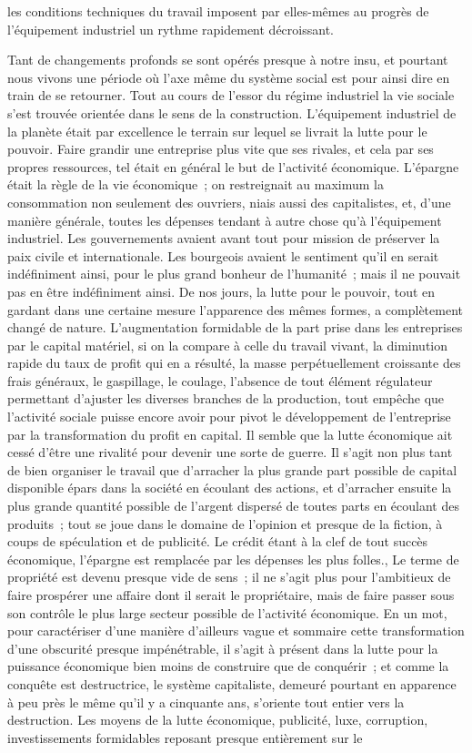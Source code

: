 \documentclass[french,twoside]{book} %
\begin{document}
les conditions techniques du travail imposent par elles-mêmes au progrès de l'équipement industriel un rythme rapidement décroissant.\par
Tant de changements profonds se sont opérés presque à notre insu, et pourtant nous vivons une période où l'axe même du système social est pour ainsi dire en train de se retourner. Tout au cours de l'essor du régime industriel la vie sociale s'est trouvée orientée dans le sens de la construction. L'équipement industriel de la planète était par excellence le terrain sur lequel se livrait la lutte pour le pouvoir. Faire grandir une entreprise plus vite que ses rivales, et cela par ses propres ressources, tel était en général le but de l'activité économique. L'épargne était la règle de la vie économique ; on restreignait au maximum la consommation non seulement des ouvriers, niais aussi des capitalistes, et, d'une manière générale, toutes les dépenses tendant à autre chose qu'à l'équipement industriel. Les gouvernements avaient avant tout pour mission de préserver la paix civile et internationale. Les bourgeois avaient le sentiment qu'il en serait indéfiniment ainsi, pour le plus grand bonheur de l'humanité ; mais il ne pouvait pas en être indéfiniment ainsi. De nos jours, la lutte pour le pouvoir, tout en gardant dans une certaine mesure l'apparence des mêmes formes, a complètement changé de nature. L'augmentation formidable de la part prise dans les entreprises par le capital matériel, si on la compare à celle du travail vivant, la diminution rapide du taux de profit qui en a résulté, la masse perpétuellement croissante des frais généraux, le gaspillage, le coulage, l'absence de tout élément régulateur permettant d'ajuster les diverses branches de la production, tout empêche que l'activité sociale puisse encore avoir pour pivot le développement de l'entreprise par la transformation du profit en capital. Il semble que la lutte économique ait cessé d'être une rivalité pour devenir une sorte de guerre. Il s'agit non plus tant de bien organiser le travail que d'arracher la plus grande part possible de capital disponible épars dans la société en écoulant des actions, et d'arracher ensuite la plus grande quantité possible de l'argent dispersé de toutes parts en écoulant des produits ; tout se joue dans le domaine de l'opinion et presque de la fiction, à coups de spéculation et de publicité. Le crédit étant à la clef de tout succès économique, l'épargne est remplacée par les dépenses les plus folles., Le terme de propriété est devenu presque vide de sens ; il ne s'agit plus pour l'ambitieux de faire prospérer une affaire dont il serait le propriétaire, mais de faire passer sous son contrôle le plus large secteur possible de l'activité économique. En un mot, pour caractériser d'une manière d'ailleurs vague et sommaire cette transformation d'une obscurité presque impénétrable, il s'agit à présent dans la lutte pour la puissance économique bien moins de construire que de conquérir ; et comme la conquête est destructrice, le système capitaliste, demeuré pourtant en apparence à peu près le même qu'il y a cinquante ans, s'oriente tout entier vers la destruction. Les moyens de la lutte économique, publicité, luxe, corruption, investissements formidables reposant presque entièrement sur le 
\end{document}
